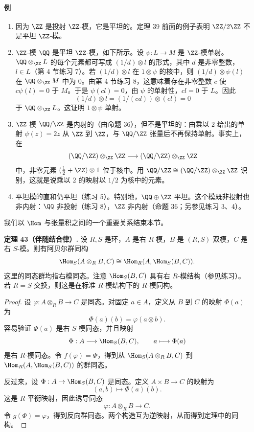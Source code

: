 \paragraph{例}
\begin{enumerate}[label=(\arabic*)]
\item 因为 $\ZZ$ 是投射 $\ZZ$-模，它是平坦的。定理 39 前面的例子表明 $\ZZ/2\ZZ$ 不是平坦 $\ZZ$-模。

\item $\ZZ$-模 $\QQ$ 是平坦 $\ZZ$-模，如下所示。设 $\psi:L\to M$ 是 $\ZZ$-模单射。$\QQ\otimes_\ZZ L$ 的每个元素都可写成 $(1/d)\otimes l$ 的形式，其中 $d$ 是非零整数，$l\in L$（第 4 节练习 7）。若 $(1/d)\otimes l$ 在 $1\otimes\psi$ 的核中，则 $(1/d)\otimes\psi(l)$ 在 $\QQ\otimes_\ZZ M$ 中为 $0$。由第 4 节练习 8，这意味着存在非零整数 $c$ 使 $c\psi(l)=0$ 于 $M$。于是 $\psi(cl)=0$，由 $\psi$ 的单射性，$cl=0$ 于 $L$。因此
\[
(1/d)\otimes l=(1/(cd))\otimes(cl)=0
\]
于 $\QQ\otimes_\ZZ L$。这证明 $1\otimes\psi$ 单射。

\item $\ZZ$-模 $\QQ/\ZZ$ 是内射的（由命题 36），但不是平坦的：由乘以 $2$ 给出的单射 $\psi(z)=2z$ 从 $\ZZ$ 到 $\ZZ$，与 $\QQ/\ZZ$ 张量后不再保持单射。事实上，在
\[
(\QQ/\ZZ)\otimes_\ZZ \ZZ\longrightarrow(\QQ/\ZZ)\otimes_\ZZ\ZZ
\]
中，非零元素 $(\tfrac12+\ZZ)\otimes1$ 位于核中。用 $\QQ/\ZZ\cong(\QQ/\ZZ)\otimes_\ZZ\ZZ$ 识别，这就是说乘以 $2$ 的映射以 $1/2$ 为核中的元素。

\item 平坦模的直和仍平坦（练习 5）。特别地，$\QQ\oplus\ZZ$ 平坦。这个模既非投射也非内射：$\QQ$ 非投射（练习 8），$\ZZ$ 非内射（命题 36；另参见练习 3、4）。
\end{enumerate}

我们以 $\Hom$ 与张量积之间的一个重要关系结束本节。

\noindent\textbf{定理 43（伴随结合律）.} 设 $R,S$ 是环，$A$ 是右 $R$-模，$B$ 是 $(R,S)$-双模，$C$ 是右 $S$-模。则有阿贝尔群同构
\[
\Hom_S(A\otimes_RB,C)
\cong
\Hom_R(A,\Hom_S(B,C)).
\]
这里的同态群均指右模同态。注意 $\Hom_S(B,C)$ 具有右 $R$-模结构（参见练习）。若 $R=S$ 交换，则这是在标准 $R$-模结构下的 $R$-模同构。

\begin{proof}
设 $\varphi:A\otimes_RB\to C$ 是同态。对固定 $a\in A$，定义从 $B$ 到 $C$ 的映射 $\Phi(a)$ 为
\[
\Phi(a)(b)=\varphi(a\otimes b).
\]
容易验证 $\Phi(a)$ 是右 $S$-模同态，并且映射
\[
\Phi:A\longrightarrow\Hom_S(B,C),
\qquad a\longmapsto \Phi(a)
\]
是右 $R$-模同态。令 $f(\varphi)=\Phi$，得到从 $\Hom_S(A\otimes_RB,C)$ 到 $\Hom_R(A,\Hom_S(B,C))$ 的群同态。

反过来，设 $\Phi:A\to\Hom_S(B,C)$ 是同态。定义 $A\times B\to C$ 的映射为
\[
(a,b)\longmapsto \Phi(a)(b).
\]
这是 $R$-平衡映射，因此诱导同态
\[
\varphi:A\otimes_RB\to C.
\]
令 $g(\Phi)=\varphi$，得到反向群同态。两个构造互为逆映射，从而得到定理中的同构。
\end{proof}

